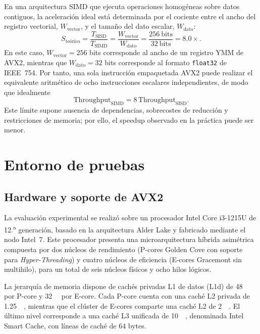 \documentclass[journal]{IEEEtran}
\begin{document}
En una arquitectura SIMD que ejecuta operaciones homogéneas sobre datos
contiguos, la aceleración ideal está determinada por el cociente entre el ancho
del registro vectorial, $W_{\mathrm{vector}}$, y el tamaño del dato escalar,
$W_{\mathrm{dato}}$:
\begin{equation}
  S_{\text{teórico}}
  = \frac{T_{\mathrm{SISD}}}{T_{\mathrm{SIMD}}}
  = \frac{W_{\mathrm{vector}}}{W_{\mathrm{dato}}}
  = \frac{256\ \text{bits}}{32\ \text{bits}}
  = 8.0\times.
  \label{eq:speedup-teorico}
\end{equation}
En este caso, $W_{\mathrm{vector}}=256$ bits corresponde al ancho de un registro
YMM de AVX2, mientras que $W_{\mathrm{dato}}=32$ bits corresponde al formato
\texttt{float32} de IEEE~754. Por tanto, una sola instrucción empaquetada AVX2
puede realizar el equivalente aritmético de ocho instrucciones escalares
independientes, de modo que idealmente
\begin{equation}
  \mathrm{Throughput}_{\mathrm{SIMD}}
  = 8\,\mathrm{Throughput}_{\mathrm{SISD}}.
  \label{eq:throughput-teorico}
\end{equation}
Este límite supone ausencia de dependencias, sobrecostes de reducción y
restricciones de memoria; por ello, el speedup observado en la práctica puede
ser menor.

\section{Entorno de pruebas}

\subsection{Hardware y soporte de AVX2}

La evaluación experimental se realizó sobre un procesador Intel Core
i3-1215U de 12.\textsuperscript{a} generación, basado en la arquitectura Alder
Lake y fabricado mediante el nodo Intel~7. Este procesador presenta una
microarquitectura híbrida asimétrica compuesta por dos núcleos de rendimiento
(P-cores Golden Cove con soporte para \textit{Hyper-Threading}) y cuatro
núcleos de eficiencia (E-cores Gracemont sin multihilo), para un total de seis
núcleos físicos y ocho hilos lógicos.

La jerarquía de memoria dispone de cachés privadas L1 de datos (L1d) de
\SI{48}{\kibi\byte} por P-core y \SI{32}{\kibi\byte} por E-core. Cada P-core
cuenta con una caché L2 privada de \SI{1.25}{\mebi\byte}, mientras que el
clúster de E-cores comparte una caché L2 de \SI{2}{\mebi\byte}. El último nivel
corresponde a una caché L3 unificada de \SI{10}{\mebi\byte}, denominada Intel
Smart Cache, con líneas de caché de 64 bytes.
\end{document}
